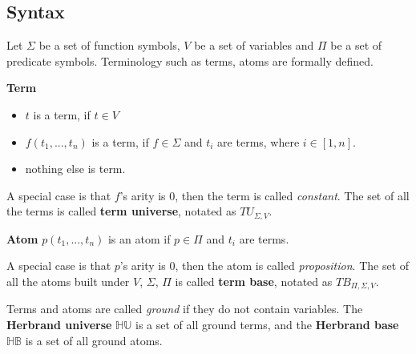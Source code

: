 \subsection{Syntax}
\label{sec:FLSyntax}
Let $\Sigma$ be a set of function symbols, $V$ be a set of variables and $\Pi$ be a set of predicate symbols. Terminology such as terms, atoms are formally defined.

\begin{defin} \textbf{Term}
\label{def:Term}
\begin{itemize}

\item $t$ is a term, if $t \in V$

\item $f(t_1,...,t_n)$ is a term, if $f \in \Sigma$ and $t_i$ are terms, where $i \in [1,n]$.

\item nothing else is term.

\end{itemize}
\end{defin}
A special case is that $f$'s arity is 0, then the term is called \textit{constant}. The set of all the terms is called \textbf{term universe}, notated as $TU_{\Sigma,V}$.

\begin{defin} \textbf{Atom}
\label{def:Atom}
$p(t_1,...,t_n)$ is an atom if $p \in \Pi$ and $t_i$ are terms.
\end{defin}
A special case is that $p$'s arity is 0, then the atom is called \textit{proposition}. The set of all the atoms built under $V$, $\Sigma$, $\Pi$ is called \textbf{term base}, notated as $TB_{\Pi,\Sigma,V}$.

Terms and atoms are called \textit{ground} if they do not contain variables. The \textbf{Herbrand universe} $\mathbb{HU}$ is a set of all ground terms, and the \textbf{Herbrand base} $\mathbb{HB}$ is a set of all ground atoms.

